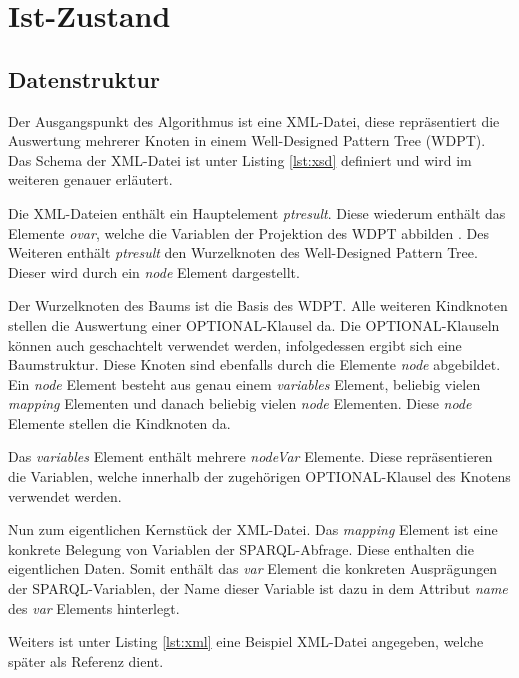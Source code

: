 \documentclass[draft,final]{vutinfth} %
\begin{document}
\chapter{Ist-Zustand} \label{istZustand}
\section{Datenstruktur} \label{dataStruk}
Der Ausgangspunkt des Algorithmus ist eine XML-Datei, diese repräsentiert die Auswertung  mehrerer Knoten in einem Well-Designed Pattern Tree (WDPT). Das Schema der XML-Datei ist unter Listing \ref{lst:xsd} definiert und wird im weiteren genauer erläutert.

Die XML-Dateien enthält ein Hauptelement \textit{ptresult}. Diese wiederum enthält das Elemente \textit{ovar}, welche die Variablen der Projektion des WDPT abbilden \cite[S.~171]{OptMat}. Des Weiteren enthält \textit{ptresult} den Wurzelknoten des Well-Designed Pattern Tree. Dieser wird durch ein \textit{node} Element dargestellt.

Der Wurzelknoten des Baums ist die Basis des WDPT. Alle weiteren Kindknoten stellen die Auswertung einer OPTIONAL-Klausel da. Die OPTIONAL-Klauseln können auch geschachtelt verwendet werden, infolgedessen ergibt sich eine Baumstruktur. Diese Knoten sind ebenfalls durch die Elemente \textit{node} abgebildet. Ein \textit{node} Element besteht aus genau einem \textit{variables} Element, beliebig vielen \textit{mapping} Elementen und danach beliebig vielen \textit{node} Elementen. Diese \textit{node} Elemente stellen die Kindknoten da.

Das \textit{variables} Element enthält mehrere \textit{nodeVar} Elemente. Diese repräsentieren die Variablen, welche innerhalb der zugehörigen OPTIONAL-Klausel des Knotens verwendet werden.

Nun zum eigentlichen Kernstück der XML-Datei. Das \textit{mapping} Element ist eine konkrete Belegung von Variablen der SPARQL-Abfrage. Diese enthalten die eigentlichen Daten. Somit enthält das \textit{var} Element die konkreten Ausprägungen der SPARQL-Variablen, der Name dieser Variable ist dazu in dem Attribut \textit{name} des \textit{var} Elements hinterlegt.\\

\pagebreak


Weiters ist unter Listing \ref{lst:xml} eine Beispiel XML-Datei angegeben, welche später als Referenz dient.

\end{document}
